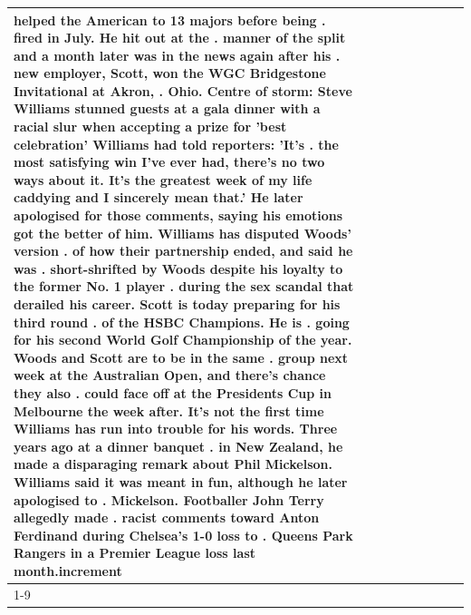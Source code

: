 \begin{table}[H]
\begin{tabular}{lllrlllll}
helped the American to 13 majors before being . fired in July. He hit out at the . manner of the split and a month later was in the news again after his . new employer, Scott, won the WGC Bridgestone Invitational at Akron, . Ohio. Centre of storm: Steve Williams stunned guests at a gala dinner with a racial slur when accepting a prize for 'best celebration' Williams had told reporters: 'It's . the most satisfying win I've ever had, there's no two ways about it. It's the greatest week of my life caddying and I sincerely mean that.' He later apologised for those comments, saying his emotions got the better of him. Williams has disputed Woods' version . of how their partnership ended, and said he was . short-shrifted by Woods despite his loyalty to the former No. 1 player . during the sex scandal that derailed his career. Scott is today preparing for his third round . of the HSBC Champions. He is . going for his second World Golf Championship of the year. Woods and Scott are to be in the same . group next week at the Australian Open, and there's chance they also . could face off at the Presidents Cup in Melbourne the week after. It's not the first time Williams has run into trouble for his words. Three years ago at a dinner banquet . in New Zealand, he made a disparaging remark about Phil Mickelson. Williams said it was meant in fun, although he later apologised to . Mickelson. Footballer John Terry allegedly made . racist comments toward Anton Ferdinand during Chelsea's 1-0 loss to . Queens Park Rangers in a Premier League loss last month.increment \\
\cline{1-9}

\end{tabular}
\end{table}
